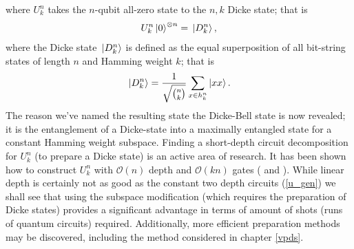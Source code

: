 \documentclass[10pt]{article}
\begin{document}
where $U^n_k$ takes the $n$-qubit all-zero state to the $n,k$ Dicke state; that is
\begin{align}
U^n_k\ket{0}^{\otimes n}=\ket*{D^n_k}
,\end{align}
where the Dicke state $\ket*{D^n_k}$ is defined as the equal superposition of all bit-string states of length $n$ and Hamming weight $k$; that is
\begin{align}
\ket*{D^n_k}
=
\frac{1}{\sqrt{{n \choose k}}}
\sum_{x\in h^n_k}\ket{xx}    
.\end{align}
The reason we've named the resulting state the Dicke-Bell state is now revealed; it is the entanglement of a Dicke-state into a maximally entangled state for a constant Hamming weight subspace. Finding a short-depth circuit decomposition for $U^n_k$ (to prepare a Dicke state) is an active area of research. It has been shown how to construct $U^n_k$ with $\mathcal{O}(n)$ depth and $\mathcal{O}(kn)$ gates (\cite{ref:dicke_prep} and \cite{ref:dicke_prep_dac}). While linear depth is certainly not as good as the constant two depth circuits (\ref{u_gen}) we shall see that using the subspace modification (which requires the preparation of Dicke states) provides a significant advantage in terms of amount of shots (runs of quantum circuits) required. Additionally, more efficient preparation methods may be discovered, including the method considered in chapter \ref{vpds}. 
\end{document}
